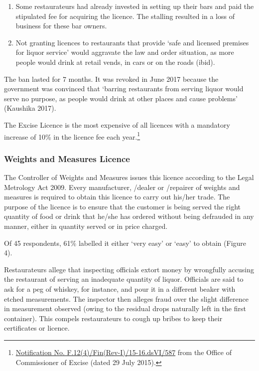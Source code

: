 \documentclass[a4paper, 12pt]{article}
\begin{document}
		\begin {enumerate}
			\item Some restaurateurs had already invested in setting up their bars and paid the stipulated fee for acquiring the licence. The stalling resulted in a loss of business for these bar owners.
			\item Not granting licences to restaurants that provide ‘safe and licensed premises for liquor service’ would aggravate the law and order situation, as more people would drink at retail vends, in cars or on the roads (ibid).
		\end {enumerate}
		
		The ban lasted for 7 months. It was revoked in June 2017 because the government was convinced that ‘barring restaurants from serving liquor would serve no purpose, as people would drink at other places and cause problems’ (Kaushika 2017).
		
		The Excise Licence is the most expensive of all licences with a mandatory increase of 10\% in the licence fee each year.\footnote{\href{https://bit.ly/2xoejoG}{Notification No. F.12(4)/Fin(Rev-I)/15-16.dsVI/587} from the Office of Commissioner of Excise (dated 29 July 2015).} %
		
		
		\subsubsection{Weights and Measures Licence}
		The Controller of Weights and Measures issues this licence according to the Legal Metrology Act 2009. Every manufacturer, /dealer or /repairer of weights and measures is required to obtain this licence to carry out his/her trade. The purpose of the licence is to ensure that the customer is being served the right quantity of food or drink that he/she has ordered without being defrauded in any manner, either in quantity served or in price charged.
		
		Of 45 respondents, 61\% labelled it either ‘very easy’ or ‘easy’ to obtain (Figure 4). %
		
		Restaurateurs allege that inspecting officials extort money by wrongfully accusing the restaurant of serving an inadequate quantity of liquor. Officials are said to ask for a peg of whiskey, for instance, and pour it in a different beaker with etched measurements. The inspector then alleges fraud over the slight difference in measurement observed (owing to the residual drops naturally left in the first container). This compels restaurateurs to cough up bribes to keep their certificates or licence.
		
\end{document}
